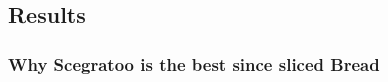 \subsection{Results}\label{results}

\subsubsection{Why Scegratoo is the best since sliced
Bread}\label{why-scegratoo-is-the-best-since-sliced-bread}
